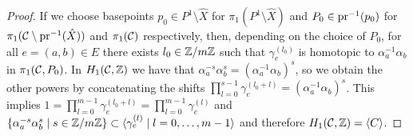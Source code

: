 \documentclass[main.tex]{subfiles}
\begin{document}
\begin{proof}
  If we choose basepoints $p_0 \in P^1 \setminus \hat{X}$ for $\pi_1(P^1 \setminus \hat{X})$ and $P_0 \in \operatorname{pr}^{-1}(p_0)$ for $\pi_1(\mathcal{C} \setminus \operatorname{pr}^{-1}(\hat{X}))$ and $\pi_1(\mathcal{C})$ respectively, then,
  depending on the choice of $P_0$, for all $e = (a,b) \in E$ there exists $l_0 \in \mathbb{Z}/m\mathbb{Z}$ such that $\gamma_e^{(l_0)}$ is homotopic to $\alpha_a^{-1} \alpha_b$ in $\pi_1(\mathcal{C},P_0)$.
   In $H_1(\mathcal{C},\mathbb{Z})$ we have that $\alpha_a^{-s}\alpha_b^{s} = ( \alpha_a^{-1}\alpha_b)^s$, so we obtain the other powers by concatenating
  the shifts $\prod_{l = 0}^{s-1} \gamma_e^{(l_0+l)} = (\alpha_a^{-1}\alpha_b)^s$.
  This implies $1 = \prod_{l = 0}^{m-1} \gamma_e^{(l_0+l)} = \prod_{l = 0}^{m-1} \gamma_e^{(l)}$ and
   $\{  \alpha_a^{-s} \alpha_b^{s}  \mid  s \in \mathbb{Z}/m\mathbb{Z}  \} \subset  \langle  \gamma_e^{(l)} 
  \mid  l = 0,\dots,m-1 \rangle$ and therefore $H_1(\mathcal{C},\mathbb{Z}) = \langle  C  \rangle$.

  \end{proof}
\end{document}
